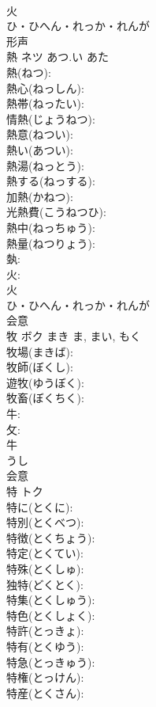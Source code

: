 \documentclass[8pt]{extreport}
\begin{document}
\begin{CJK}{UTF8}{min}
\\	火	
\\	ひ・ひへん・れっか・れんが	
\\	形声 
\\	熱	ネツ	あつ.い	あた	
\\	熱(ねつ): 
\\	熱心(ねっしん): 
\\	熱帯(ねったい): 
\\	情熱(じょうねつ): 
\\	熱意(ねつい): 
\\	熱い(あつい): 
\\	熱湯(ねっとう): 
\\	熱する(ねっする): 
\\	加熱(かねつ): 
\\	光熱費(こうねつひ): 
\\	熱中(ねっちゅう): 
\\	熱量(ねつりょう): 
\\	埶: 
\\	火: 
\\	火	
\\	ひ・ひへん・れっか・れんが	
\\	会意 
\\	牧	ボク	まき	ま, まい, もく	
\\	牧場(まきば): 
\\	牧師(ぼくし): 
\\	遊牧(ゆうぼく): 
\\	牧畜(ぼくちく): 
\\	牛: 
\\	攵: 
\\	牛	
\\	うし	
\\	会意 
\\	特	トク			
\\	特に(とくに): 
\\	特別(とくべつ): 
\\	特徴(とくちょう): 
\\	特定(とくてい): 
\\	特殊(とくしゅ): 
\\	独特(どくとく): 
\\	特集(とくしゅう): 
\\	特色(とくしょく): 
\\	特許(とっきょ): 
\\	特有(とくゆう): 
\\	特急(とっきゅう): 
\\	特権(とっけん): 
\\	特産(とくさん): 

\end{CJK}
\end{document}
